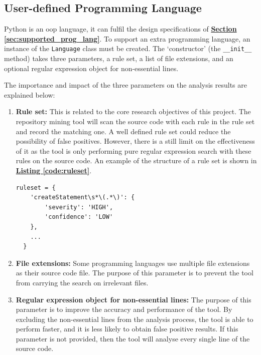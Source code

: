 \documentclass[12pt, a4paper]{report}
\begin{document}
\subsection{User-defined Programming Language}
Python is an \acrfull{oop} language, it can fulfil the design specifications of
\hyperref[sec:supported_prog_lang]{\textbf{Section \ref*{sec:supported_prog_lang}}}. To support an
extra programming language, an instance of the \texttt{Language} class must be created. The
`constructor' (the \texttt{\_\_init\_\_} method) takes three parameters, a rule set, a list of file
extensions, and an optional regular expression object for non-essential lines.

The importance and impact of the three parameters on the analysis results are explained below:
\begin{enumerate}
  \item \textbf{Rule set:} This is related to the core research objectives of this project. The
  repository mining tool will scan the source code with each rule in the rule set and record the
  matching one. A well defined rule set could reduce the possibility of false positives. However,
  there is a still limit on the effectiveness of it as the tool is only performing pure regular
  expression search with these rules on the source code. An example of the structure of a rule set
  is shown in \hyperref[code:ruleset]{\textbf{Listing \ref*{code:ruleset}}}.
  \begin{lstlisting}[basicstyle=\ttfamily, label=code:ruleset,
    caption=An example snippet of the Java ruleset.]
  ruleset = {
    'createStatement\s*\(.*\)': {
        'severity': 'HIGH',
        'confidence': 'LOW'
    },
    ...
  }
  \end{lstlisting}
  \item \textbf{File extensions:} Some programming languages use multiple file extensions as their
  source code file. The purpose of this parameter is to prevent the tool from carrying the search on
  irrelevant files.
  \item \textbf{Regular expression object for non-essential lines:} The purpose of this parameter is
  to improve the accuracy and performance of the tool. By excluding the non-essential lines from the
  analysis process, the tool is able to perform faster, and it is less likely to obtain false
  positive results. If this parameter is not provided, then the tool will analyse every single line
  of the source code.
\end{enumerate}
\end{document}
